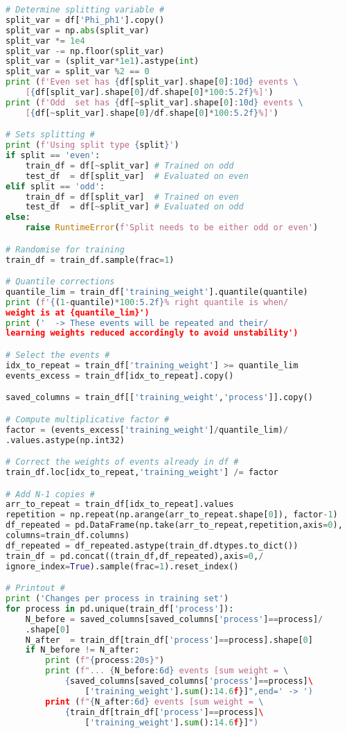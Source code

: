 \begin{lstlisting}[language=Python, caption=DNN setup for the \wwgg semi-leptonic final state, label={dnncode}]
# Determine splitting variable #
split_var = df['Phi_ph1'].copy()
split_var = np.abs(split_var)
split_var *= 1e4
split_var -= np.floor(split_var) 
split_var = (split_var*1e1).astype(int)
split_var = split_var %2 == 0
print (f'Even set has {df[split_var].shape[0]:10d} events \
    [{df[split_var].shape[0]/df.shape[0]*100:5.2f}%]')
print (f'Odd  set has {df[~split_var].shape[0]:10d} events \
    [{df[~split_var].shape[0]/df.shape[0]*100:5.2f}%]')

# Sets splitting #
print (f'Using split type {split}')
if split == 'even':
    train_df = df[~split_var] # Trained on odd
    test_df  = df[split_var]  # Evaluated on even 
elif split == 'odd':
    train_df = df[split_var]  # Trained on even
    test_df  = df[~split_var] # Evaluated on odd 
else:
    raise RuntimeError(f'Split needs to be either odd or even')

# Randomise for training
train_df = train_df.sample(frac=1)

# Quantile corrections
quantile_lim = train_df['training_weight'].quantile(quantile)
print (f'{(1-quantile)*100:5.2f}% right quantile is when/
weight is at {quantile_lim}')
print ('  -> These events will be repeated and their/
learning weights reduced accordingly to avoid unstability') 

# Select the events #
idx_to_repeat = train_df['training_weight'] >= quantile_lim                          
events_excess = train_df[idx_to_repeat].copy()

saved_columns = train_df[['training_weight','process']].copy()

# Compute multiplicative factor #
factor = (events_excess['training_weight']/quantile_lim)/
.values.astype(np.int32) 

# Correct the weights of events already in df #
train_df.loc[idx_to_repeat,'training_weight'] /= factor

# Add N-1 copies #
arr_to_repeat = train_df[idx_to_repeat].values                                       
repetition = np.repeat(np.arange(arr_to_repeat.shape[0]), factor-1)                   
df_repeated = pd.DataFrame(np.take(arr_to_repeat,repetition,axis=0),
columns=train_df.columns)
df_repeated = df_repeated.astype(train_df.dtypes.to_dict())
train_df = pd.concat((train_df,df_repeated),axis=0,/
ignore_index=True).sample(frac=1).reset_index()

# Printout #
print ('Changes per process in training set')
for process in pd.unique(train_df['process']):
    N_before = saved_columns[saved_columns['process']==process]/
    .shape[0]
    N_after  = train_df[train_df['process']==process].shape[0]
    if N_before != N_after:
        print (f"{process:20s}")
        print (f"... {N_before:6d} events [sum weight = \
            {saved_columns[saved_columns['process']==process]\
                ['training_weight'].sum():14.6f}]",end=' -> ')
        print (f"{N_after:6d} events [sum weight = \
            {train_df[train_df['process']==process]\
                ['training_weight'].sum():14.6f}]")
    

\end{lstlisting}
